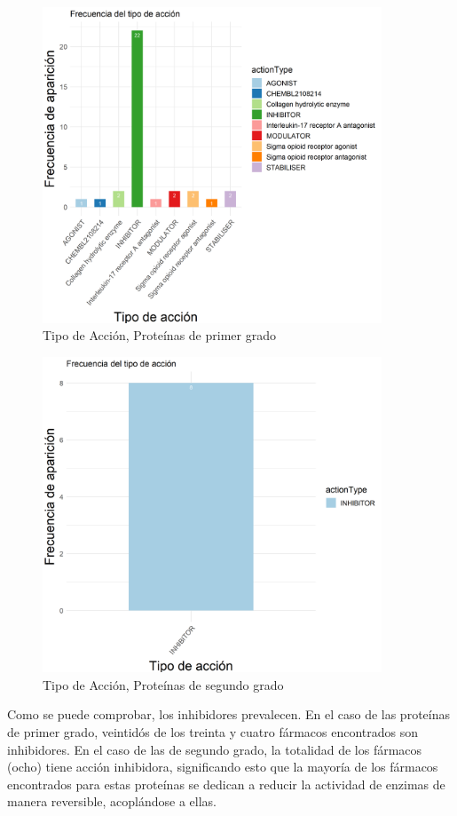 \begin{figure}[h]
			\includegraphics[width=0.9\textwidth]{figures/graficaTipoDeAccionProteinas1.png}
			\caption{Tipo de Acción, Proteínas de primer grado}
\end{figure}
\clearpage
\begin{figure}[h]
			\includegraphics[width=0.9\textwidth]{figures/graficaTipoDeAccion.png}
			\caption{Tipo de Acción, Proteínas de segundo grado}
\end{figure}
Como se puede comprobar, los inhibidores prevalecen. En el caso de las proteínas de primer grado, veintidós de los treinta y cuatro fármacos encontrados son inhibidores. En el caso de las de segundo grado, la totalidad de los fármacos (ocho) tiene acción inhibidora, significando esto que la mayoría de los fármacos encontrados para estas proteínas se dedican a reducir la actividad de enzimas de manera reversible, acoplándose a ellas.
	
